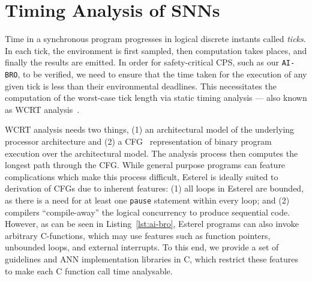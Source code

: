 \section{Timing Analysis of \acfp{SNN}}
\label{sec:wcrt}

Time in a synchronous program progresses in logical discrete instants called \emph{ticks}. 
In each tick, the environment is first sampled, then computation takes places, and finally the results are emitted.
In order for safety-critical \ac{CPS}, such as our \texttt{AI-BRO}, to be verified, we need to ensure that the time taken for the execution of any given tick is less than their environmental deadlines.
This necessitates the computation of the worst-case tick length via static timing analysis --- also known as \acf{WCRT} analysis~\cite{roop2009tight}.

\ac{WCRT} analysis needs two things, (1) an architectural model of the
underlying processor architecture and (2) a \acf{CFG}~\cite{wilhelm2008worst}  representation of
binary program execution over the architectural model. The analysis
process then computes the longest path through the \ac{CFG}.
While general purpose programs can feature complications which make this process difficult, Esterel is ideally suited to derivation of \acp{CFG} due to inherent features:  (1)
all loops in Esterel are bounded, as there is a need for at least one \texttt{pause} statement
within every loop; and (2) compilers ``compile-away'' the logical
concurrency to produce sequential code. However, as can be seen in
Listing~\ref{lst:ai-bro}, 
Esterel programs can also invoke arbitrary C-functions, which may use
features such as function pointers, unbounded loops, and external interrupts. 
To this end, we provide a set of guidelines and \ac{ANN}
implementation libraries in C,
which restrict these features to make each C function call time
analysable. 


